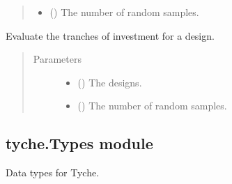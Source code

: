 \documentclass[letterpaper,10pt,english]{sphinxmanual}
\begin{document}
\begin{fulllineitems}
\begin{fulllineitems}
\begin{quote}
\begin{description}
\begin{itemize}
\item {} 
 () \textendash{} The number of random samples.

\end{itemize}

\end{description}\end{quote}

\end{fulllineitems}


\begin{fulllineitems}
\label{\detokenize{doc-src/tyche:tyche.Investments.Investments.evaluate_tranches}}
Evaluate the tranches of investment for a design.
\begin{quote}\begin{description}
\item[{Parameters}] \leavevmode\begin{itemize}
\item {} 
 () \textendash{} The designs.

\item {} 
 () \textendash{} The number of random samples.

\end{itemize}

\end{description}\end{quote}

\end{fulllineitems}


\end{fulllineitems}



\subsection{tyche.Types module}
\label{\detokenize{doc-src/tyche:module-tyche.Types}}\label{\detokenize{doc-src/tyche:tyche-types-module}}
Data types for Tyche.
\end{document}
